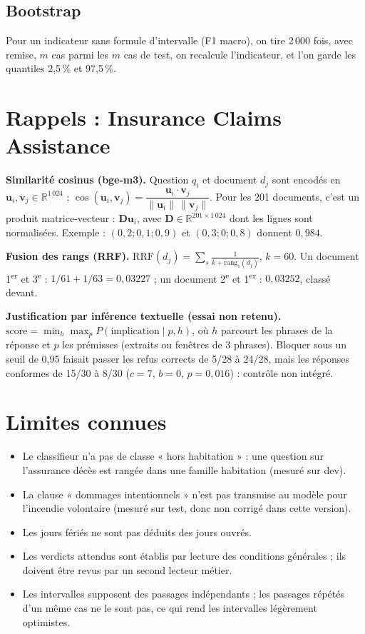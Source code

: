 \documentclass[11pt,a4paper]{article}
\newcommand{\R}{\mathbb{R}}
\newcommand{\vect}[1]{\bm{#1}}
\newcommand{\mat}[1]{\mathbf{#1}}
\begin{document}
\subsection{Bootstrap}
Pour un indicateur sans formule d'intervalle (F1 macro), on tire 2\,000 fois, avec remise, $m$ cas
parmi les $m$ cas de test, on recalcule l'indicateur, et l'on garde les quantiles 2,5\,\% et 97,5\,\%.

\section{Rappels : Insurance Claims Assistance}

\textbf{Similarité cosinus (bge-m3).} Question $q_i$ et document $d_j$ sont encodés en
$\vect{u}_i,\vect{v}_j\in\R^{1\,024}$ ; $\cos(\vect{u}_i,\vect{v}_j) = \dfrac{\vect{u}_i\cdot\vect{v}_j}{\|\vect{u}_i\|\,\|\vect{v}_j\|}$.
Pour les 201 documents, c'est un produit matrice-vecteur : $\mat{D}\vect{u}_i$, avec $\mat{D}\in\R^{201\times1\,024}$
dont les lignes sont normalisées. Exemple : $(0{,}2;0{,}1;0{,}9)$ et $(0{,}3;0;0{,}8)$ donnent $0{,}984$.

\textbf{Fusion des rangs (RRF).} $\mathrm{RRF}(d_j)=\sum_{s}\frac{1}{k+\mathrm{rang}_s(d_j)}$, $k=60$.
Un document 1\textsuperscript{er} et 3\textsuperscript{e} : $1/61+1/63=0{,}03227$ ; un document 2\textsuperscript{e}
et 1\textsuperscript{er} : $0{,}03252$, classé devant.

\textbf{Justification par inférence textuelle (essai non retenu).}
$\mathrm{score} = \min_{h}\max_{p} P(\text{implication}\mid p,h)$, où $h$ parcourt les phrases de la
réponse et $p$ les prémisses (extraits ou fenêtres de 3 phrases). Bloquer sous un seuil de 0,95
faisait passer les refus corrects de 5/28 à 24/28, mais les réponses conformes de 15/30 à 8/30
($c=7$, $b=0$, $p=0{,}016$) : contrôle non intégré.

\section{Limites connues}
\begin{itemize}
\item Le classifieur n'a pas de classe « hors habitation » : une question sur l'assurance décès est
rangée dans une famille habitation (mesuré sur dev).
\item La clause « dommages intentionnels » n'est pas transmise au modèle pour l'incendie volontaire
(mesuré sur test, donc non corrigé dans cette version).
\item Les jours fériés ne sont pas déduits des jours ouvrés.
\item Les verdicts attendus sont établis par lecture des conditions générales ; ils doivent être
revus par un second lecteur métier.
\item Les intervalles supposent des passages indépendants ; les passages répétés d'un même cas ne
le sont pas, ce qui rend les intervalles légèrement optimistes.
\end{itemize}
\end{document}
